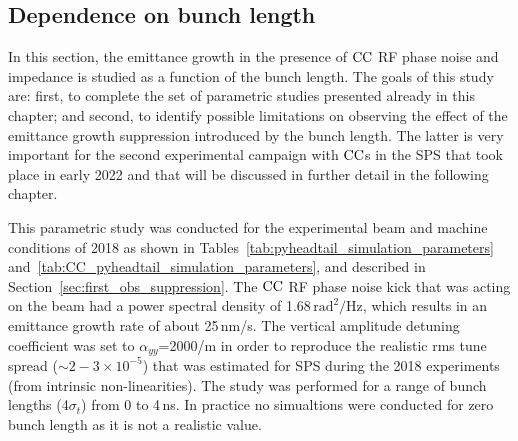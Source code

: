 





\subsection{Dependence on bunch length}\label{subsec:dependence_on_sigma_z}

In this section, the emittance growth in the presence of ${\mathrm{CC}}$ RF phase noise and impedance is studied as a function of the bunch length. The goals of this study are: first, to complete the set of parametric studies presented already in this chapter; and second, to identify possible limitations on observing the effect of the emittance growth suppression introduced by the bunch length. The latter is very important for the second experimental campaign with ${\mathrm{CC}}$s in the SPS that took place in early 2022 and that will be discussed in further detail in the following chapter.

This parametric study was conducted for the experimental beam and machine conditions of 2018 as shown in Tables~\ref{tab:pyheadtail_simulation_parameters} and~\ref{tab:CC_pyheadtail_simulation_parameters}, and described in Section~\ref{sec:first_obs_suppression}. The ${\mathrm{CC}}$ RF phase noise kick that was acting on the beam had a power spectral density of 1.68\,$\mathrm{rad^2/Hz}$, which results in an emittance growth rate of about 25\,nm/s. The vertical amplitude detuning coefficient was set to $\alpha_{yy}$=2000/m in order to reproduce the realistic rms tune spread ($\sim 2-3 \times 10^{-5}$) that was estimated for SPS during the 2018 experiments (from intrinsic non-linearities). The study was performed for a range of bunch lengths (4$\sigma_t$) from 0 to 4\,ns. In practice no simualtions were conducted for zero bunch length as it is not a realistic value.


